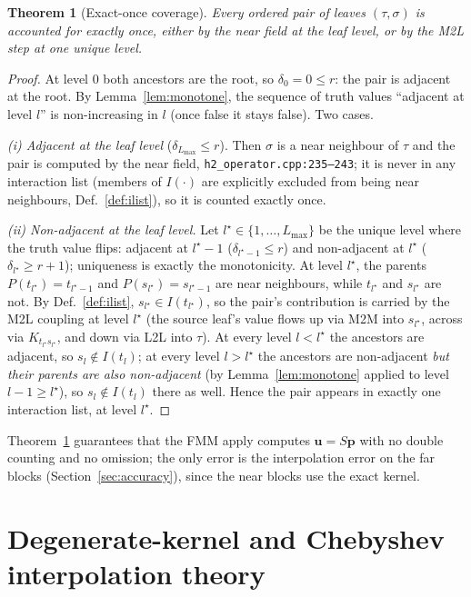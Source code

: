 \documentclass[11pt,a4paper]{article}
\newcommand{\pp}{\mathbf{p}}
\newcommand{\code}[1]{\texttt{#1}}
\newtheorem{theorem}{Theorem}
\theoremstyle{definition}
\theoremstyle{remark}
\begin{document}
\begin{theorem}[Exact-once coverage]
\label{thm:coverage}
Every ordered pair of leaves $(\tau,\sigma)$ is accounted for exactly once,
either by the near field at the leaf level, or by the M2L step at one unique
level.
\end{theorem}
\begin{proof}
At level $0$ both ancestors are the root, so $\delta_0=0\le r$: the pair is
adjacent at the root. By Lemma~\ref{lem:monotone}, the sequence of truth values
``adjacent at level $l$'' is non-increasing in $l$ (once false it stays false).
Two cases.

\emph{(i) Adjacent at the leaf level} ($\delta_{L_{\max}}\le r$). Then $\sigma$
is a near neighbour of $\tau$ and the pair is computed by the near field,
\code{h2\_operator.cpp:235--243}; it is never in any interaction list (members of
$I(\cdot)$ are explicitly excluded from being near neighbours, Def.~\ref{def:ilist}),
so it is counted exactly once.

\emph{(ii) Non-adjacent at the leaf level.} Let $l^\star\in\{1,\dots,L_{\max}\}$
be the unique level where the truth value flips: adjacent at $l^\star-1$
($\delta_{l^\star-1}\le r$) and non-adjacent at $l^\star$
($\delta_{l^\star}\ge r+1$); uniqueness is exactly the monotonicity. At level
$l^\star$, the parents $P(t_{l^\star})=t_{l^\star-1}$ and
$P(s_{l^\star})=s_{l^\star-1}$ are near neighbours, while $t_{l^\star}$ and
$s_{l^\star}$ are not. By Def.~\ref{def:ilist}, $s_{l^\star}\in I(t_{l^\star})$,
so the pair's contribution is carried by the M2L coupling at level $l^\star$
(the source leaf's value flows up via M2M into $s_{l^\star}$, across via
$K_{t_{l^\star}s_{l^\star}}$, and down via L2L into $\tau$). At every level
$l<l^\star$ the ancestors are adjacent, so $s_l\notin I(t_l)$; at every level
$l>l^\star$ the ancestors are non-adjacent \emph{but their parents are also
non-adjacent} (by Lemma~\ref{lem:monotone} applied to level $l-1\ge l^\star$),
so $s_l\notin I(t_l)$ there as well. Hence the pair appears in exactly one
interaction list, at level $l^\star$.
\end{proof}

Theorem~\ref{thm:coverage} guarantees that the FMM apply computes
$\mathbf u=S\pp$ with no double counting and no omission; the only error is the
interpolation error on the far blocks (Section~\ref{sec:accuracy}), since the
near blocks use the exact kernel.

\section{Degenerate-kernel and Chebyshev interpolation theory}
\label{sec:degenerate}
\end{document}
